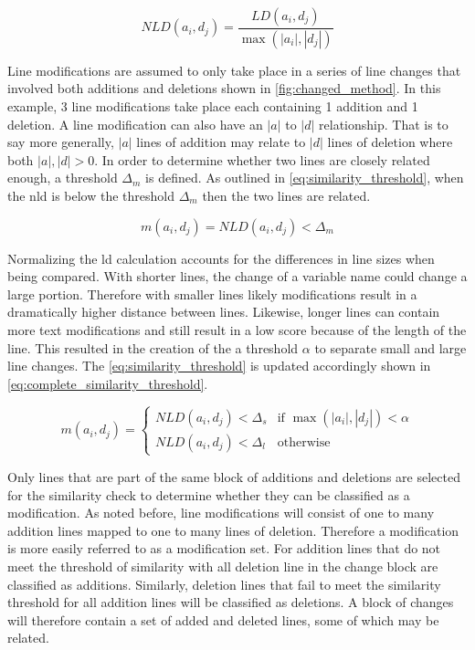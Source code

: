 
\begin{equation}
\label{eq:normalized_ld}
NLD(a_i, d_j) = \frac{LD(a_i, d_j)}{\max(|a_i|,|d_j|)}
\end{equation}

Line modifications are assumed to only take place in a series of line changes that involved both additions and deletions shown in \autoref{fig:changed_method}. In this example, 3 line modifications take place each containing 1 addition and 1 deletion. A line modification can also have an $|a|$ to $|d|$ relationship. That is to say more generally, $|a|$ lines of addition may relate to $|d|$ lines of deletion where both $|a|, |d| > 0$. In order to determine whether two lines are closely related enough, a threshold $\Delta_m$ is defined. As outlined in \autoref{eq:similarity_threshold}, when the \gls{nld} is below the threshold $\Delta_m$ then the two lines are related.

\begin{equation}
\label{eq:similarity_threshold}
m(a_i, d_j) = NLD(a_i, d_j) < \Delta_m
\end{equation}

Normalizing the \gls{ld} calculation accounts for the differences in line sizes when being compared. With shorter lines, the change of a variable name could change a large portion. Therefore with smaller lines likely modifications result in a dramatically higher distance between lines. Likewise, longer lines can contain more text modifications and still result in a low score because of the length of the line. This resulted in the creation of the a threshold $\alpha$ to separate small and large line changes. The \autoref{eq:similarity_threshold} is updated accordingly shown in \autoref{eq:complete_similarity_threshold}.

\begin{equation}
\label{eq:complete_similarity_threshold}
m(a_i, d_j) = \left\{\begin{matrix}
NLD(a_i, d_j) < \Delta_s & \text{if } \max(|a_i|, |d_j|) < \alpha \\ 
NLD(a_i, d_j) < \Delta_l & \text{otherwise}
\end{matrix}\right.
\end{equation}

Only lines that are part of the same block of additions and deletions are selected for the similarity check to determine whether they can be classified as a modification. As noted before, line modifications will consist of one to many addition lines mapped to one to many lines of deletion. Therefore a modification is more easily referred to as a modification set. For addition lines that do not meet the threshold of similarity with all deletion line in the change block are classified as additions. Similarly, deletion lines that fail to meet the similarity threshold for all addition lines will be classified as deletions. A block of changes will therefore contain a set of added and deleted lines, some of which may be related.

